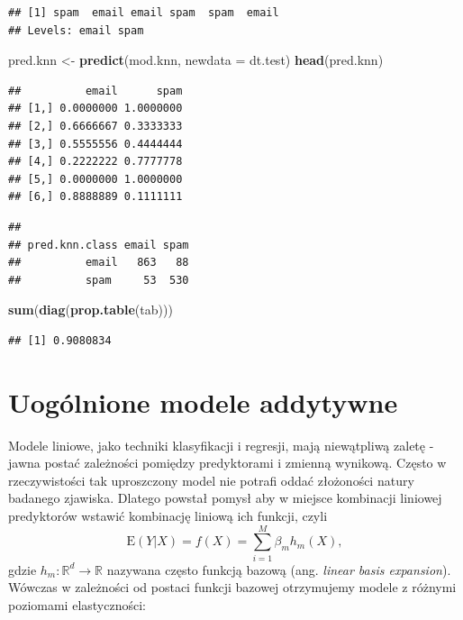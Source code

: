 \documentclass[]{book}
\newenvironment{Shaded}{\begin{snugshade}}{\end{snugshade}}
\newcommand{\DataTypeTok}[1]{\textcolor[rgb]{0.13,0.29,0.53}{#1}}
\newcommand{\KeywordTok}[1]{\textcolor[rgb]{0.13,0.29,0.53}{\textbf{#1}}}
\newcommand{\NormalTok}[1]{#1}
\newcommand{\OperatorTok}[1]{\textcolor[rgb]{0.81,0.36,0.00}{\textbf{#1}}}
\newcommand{\StringTok}[1]{\textcolor[rgb]{0.31,0.60,0.02}{#1}}
\newcommand{\E}{\mathrm{E}}
\theoremstyle{plain}
\theoremstyle{definition}
\theoremstyle{definition}
\theoremstyle{definition}
\theoremstyle{definition}
\theoremstyle{remark}
\begin{document}
\begin{verbatim}
## [1] spam  email email spam  spam  email
## Levels: email spam
\end{verbatim}

\begin{Shaded}
\begin{Highlighting}[]
\NormalTok{pred.knn <-}\StringTok{ }\KeywordTok{predict}\NormalTok{(mod.knn, }\DataTypeTok{newdata =}\NormalTok{ dt.test)}
\KeywordTok{head}\NormalTok{(pred.knn)}
\end{Highlighting}
\end{Shaded}

\begin{verbatim}
##          email      spam
## [1,] 0.0000000 1.0000000
## [2,] 0.6666667 0.3333333
## [3,] 0.5555556 0.4444444
## [4,] 0.2222222 0.7777778
## [5,] 0.0000000 1.0000000
## [6,] 0.8888889 0.1111111
\end{verbatim}

\begin{Shaded}
\end{Shaded}

\begin{verbatim}
##               
## pred.knn.class email spam
##          email   863   88
##          spam     53  530
\end{verbatim}

\begin{Shaded}
\begin{Highlighting}[]
\KeywordTok{sum}\NormalTok{(}\KeywordTok{diag}\NormalTok{(}\KeywordTok{prop.table}\NormalTok{(tab)))}
\end{Highlighting}
\end{Shaded}

\begin{verbatim}
## [1] 0.9080834
\end{verbatim}

\hypertarget{uogolnione-modele-addytywne}{%
\chapter{Uogólnione modele addytywne}\label{uogolnione-modele-addytywne}}

Modele liniowe, jako techniki klasyfikacji i regresji, mają niewątpliwą zaletę - jawna postać zależności pomiędzy predyktorami i zmienną wynikową. Często w rzeczywistości tak uproszczony model nie potrafi oddać złożoności natury badanego zjawiska. Dlatego powstał pomysł aby w miejsce kombinacji liniowej predyktorów wstawić kombinację liniową ich funkcji, czyli
\begin{equation}
    \E(Y|X)=f(X) = \sum_{i=1}^M\beta_mh_m(X),
    \label{eq:row111}
\end{equation}
gdzie \(h_m:\mathbb{R}^d\to\mathbb{R}\) nazywana często funkcją bazową (ang. \emph{linear basis expansion}). Wówczas w zależności od postaci funkcji bazowej otrzymujemy modele z różnymi poziomami elastyczności:
\end{document}
